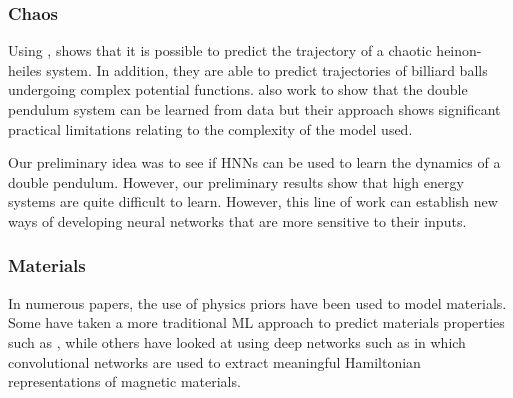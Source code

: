 \documentclass{article}
\begin{document}
\subsubsection{Chaos}

Using , \cite{choudhary_physics_2019} shows that it is possible to predict the trajectory of a chaotic heinon-heiles system. In addition, they are able to predict trajectories of billiard balls undergoing complex potential functions. \cite{cranmer_lagrangian_2020} also work to show that the double pendulum system can be learned from data but their approach shows significant practical limitations relating to the complexity of the model used.

Our preliminary idea was to see if HNNs can be used to learn the dynamics of a double pendulum. However, our preliminary results show that high energy systems are quite difficult to learn. However, this line of work can establish new ways of developing neural networks that are more sensitive to their inputs. 


\subsubsection{Materials}

In numerous papers, \cite{rupp_fast_2012,witkoskie_neural_2005,pukrittayakamee_simultaneous_2009,smith_ani-1_2017,yao_tensormol-01_2018} the use of physics priors have been used to model materials. Some have taken a more traditional ML approach to predict materials properties such as \cite{rupp_fast_2012}, while others have looked at using deep networks such as \cite{wang_machine_2019} in which convolutional networks are used to extract meaningful Hamiltonian representations of magnetic materials.









\end{document}
